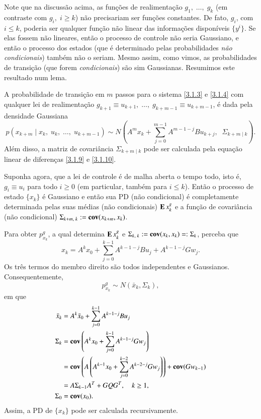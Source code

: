 Note que na discussão acima, as funções de realimentação $g_1,\;\dots,\;g_k$ (em contraste com $g_i,\;i\ge k$) não precisariam ser funções constantes. De fato, $g_i$, com $i\le k$, poderia ser qualquer função não linear das informações disponíveis $\{y^i\}$. Se elas fossem não lineares, então o processo de controle não seria Gaussiano, e então o processo dos estados (que é determinado pelas probabilidades \emph{não condicionais}) também não o seriam. Mesmo assim, como vimos, as probabilidades de transição (que forem \emph{condicionais}) são sim Gaussianas. Resumimos este resultado num lema.
\begin{Lema}
A probabilidade de transição em $m$ passos para o sistema \eqref{3.1.3} e \eqref{3.1.4} com qualquer lei de realimentação $g_{k+1}\equiv u_{k+1},\;\dots,\; g_{k+m-1}\equiv u_{k+m-1}$, é dada pela densidade Gaussiana
\[
p(x_{k+m}\;|\;x_k,\;u_k,\;\dots,\;u_{k+m-1})
	\sim N\left(A^mx_k+\sum_{j=0}^{m-1}
	A^{m-1-j}Bu_{k+j},\;\;
	\Sigma_{k+m\;|\;k}\right).
\]
Além disso, a matriz de covariância $\Sigma_{k+m\;|\;k}$ pode ser calculada pela equação linear de diferenças \eqref{3.1.9} e \eqref{3.1.10}.
\end{Lema}

Suponha agora, que a lei de controle é de malha aberta o tempo todo, isto é, $g_i\equiv u_i$ para todo $i\ge0$ (em particular, também para $i\le k$). Então o processo de estado $\{x_k\}$ é Gaussiano e então sua PD (não condicional) é completamente determinada pelas suas médias (não condicionais) $\operatorname{\bf E} x^g_k$ e a função de covariância (não condicional) $\Sigma_{k+m,\;k}:=\operatorname{\bf cov}(x_{k+m},x_k)$.

Para obter $p^g_{x_k}$, a qual determina $\operatorname{\bf E} x^g_k$ e $\Sigma_{k,\;k}:=\operatorname{\bf cov}(x_{k},x_k)=:\Sigma_k$, perceba que
\[
x_{k}=A^kx_0+\sum_{j=0}^{k-1}A^{k-1-j}Bu_{j}+A^{k-1-j}Gw_{j}.
\]
Os três termos do membro direito são todos independentes e Gaussianos. Consequentemente,
\[
p^g_{x_k}\sim N(\bar x_k, \Sigma_k),
\]
em que
\begin{align}
	\bar x_k &=A^k\bar x_0+
	\sum_{j=0}^{k-1}A^{k-1-j}Bu_{j}\nonumber\\
	\Sigma_k&=\operatorname{\bf cov}\left(A^kx_0+
	\sum_{j=0}^{k-1}A^{k-1-j}Gw_{j}\right)
	\nonumber\\
	&=\operatorname{\bf cov}\left(A\left(A^{k-1}x_0+
	\sum_{j=0}^{k-2}A^{k-2-j}Gw_{j}\right)
	\right)
	+\operatorname{\bf cov}(Gw_{k-1})
	\nonumber\\
	&=A \Sigma_{k-1}A^T+GQG^T, \quad k\ge1,
	\label{3.1.12}\\
	\Sigma_0&=\operatorname{\bf cov}(x_0)\label{3.1.13}.
\end{align}
Assim, a PD de $\{x_k\}$ pode ser calculada recursivamente.

